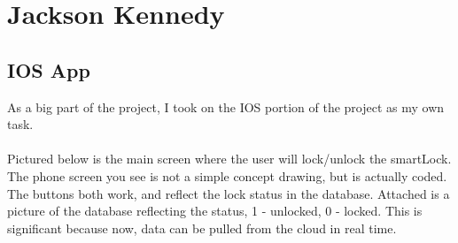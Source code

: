\section{Jackson Kennedy}

\subsection{IOS App}
As a big part of the project, I took on the IOS portion of the project as my own task.
\\\\
Pictured below is the main screen where the user will lock/unlock the smartLock. The phone screen you see is not a simple concept drawing, but is actually coded. The buttons both work, and reflect the lock status in the database. Attached is a picture of the database reflecting the status, 1 - unlocked, 0 - locked. This is significant because now, data can be pulled from the cloud in real time.
